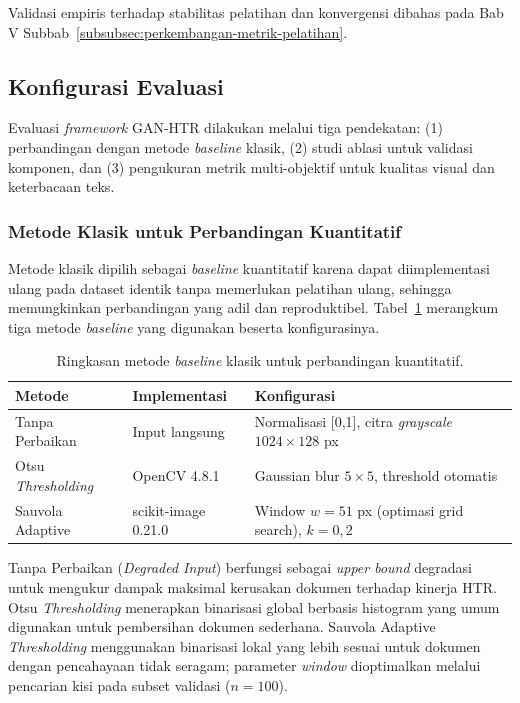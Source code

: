 \documentclass[12pt,a4paper]{article}
\begin{document}
Validasi empiris terhadap stabilitas pelatihan dan konvergensi dibahas pada Bab V Subbab~\ref{subsubsec:perkembangan-metrik-pelatihan}.

\subsection{Konfigurasi Evaluasi}
\label{subsec:konfigurasi-evaluasi}

Evaluasi \textit{framework} GAN-HTR dilakukan melalui tiga pendekatan: (1) perbandingan dengan metode \textit{baseline} klasik, (2) studi ablasi untuk validasi komponen, dan (3) pengukuran metrik multi-objektif untuk kualitas visual dan keterbacaan teks.

\subsubsection{Metode Klasik untuk Perbandingan Kuantitatif}

Metode klasik dipilih sebagai \textit{baseline} kuantitatif karena dapat diimplementasi ulang pada dataset identik tanpa memerlukan pelatihan ulang, sehingga memungkinkan perbandingan yang adil dan reproduktibel. Tabel~\ref{tab:metode-baseline} merangkum tiga metode \textit{baseline} yang digunakan beserta konfigurasinya.

\begin{table}[H]
  \caption[Ringkasan metode \textit{baseline} klasik]{Ringkasan metode \textit{baseline} klasik untuk perbandingan kuantitatif.}
  \label{tab:metode-baseline}
  \small

  \renewcommand{\arraystretch}{1.3}
  \begin{tabular}{|l|p{3.5cm}|p{6.5cm}|}
    \hline
    \textbf{Metode} & \textbf{Implementasi} & \textbf{Konfigurasi} \\
    \hline
    Tanpa Perbaikan & Input langsung & Normalisasi [0,1], citra \textit{grayscale} $1024 \times 128$ px \\
    \hline
    Otsu \textit{Thresholding} & OpenCV 4.8.1 & Gaussian blur $5\times5$, threshold otomatis \\
    \hline
    Sauvola Adaptive & scikit-image 0.21.0 & Window $w=51$ px (optimasi grid search), $k=0,2$ \\
    \hline
  \end{tabular}
\end{table}

Tanpa Perbaikan (\textit{Degraded Input}) berfungsi sebagai \textit{upper bound} degradasi untuk mengukur dampak maksimal kerusakan dokumen terhadap kinerja HTR. Otsu \textit{Thresholding} menerapkan binarisasi global berbasis histogram yang umum digunakan untuk pembersihan dokumen sederhana. Sauvola Adaptive \textit{Thresholding} menggunakan binarisasi lokal yang lebih sesuai untuk dokumen dengan pencahayaan tidak seragam; parameter \textit{window} dioptimalkan melalui pencarian kisi pada subset validasi ($n=100$).
\end{document}
